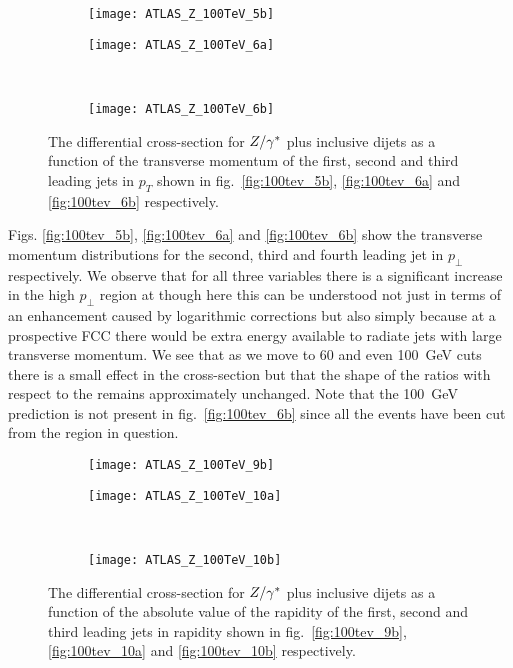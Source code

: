 	\begin{figure}[bth]
		\centering
		\begin{subfigure}[b]{0.48\textwidth}
			\texttt{[image: ATLAS\_Z\_100TeV\_5b]}
			\caption{}
			\label{fig:100tev_5b}
		\end{subfigure}

		\begin{subfigure}[b]{0.48\textwidth}
			\texttt{[image: ATLAS\_Z\_100TeV\_6a]}
			\caption{}
			\label{fig:100tev_6a}
		\end{subfigure}
		~
		\begin{subfigure}[b]{0.48\textwidth}
			\texttt{[image: ATLAS\_Z\_100TeV\_6b]}
			\caption{}
			\label{fig:100tev_6b}
		\end{subfigure}
		\caption{The differential cross-section for $Z/\gamma^*$ plus inclusive dijets as a function of the transverse momentum
		         of the first, second and third leading jets in $p_T$ shown in fig.~\eqref{fig:100tev_5b}, \eqref{fig:100tev_6a}
		         and \eqref{fig:100tev_6b} respectively.}
	\end{figure}

	Figs. \eqref{fig:100tev_5b}, \eqref{fig:100tev_6a} and \eqref{fig:100tev_6b} show the transverse momentum
	distributions for the second, third and fourth leading jet in $p_\perp$ respectively.  We observe that for all three
	variables there is a significant increase in the high $p_\perp$ region at \htev though here this can be understood
	not just in terms of an enhancement caused by logarithmic corrections but also simply because at a prospective FCC
	there would be extra energy available to radiate jets with large transverse momentum.  We see that as we move to
	60 and even 100~GeV cuts there is a small effect in the cross-section but that the shape of the ratios with respect
	to the \stev remains approximately unchanged.  Note that the 100~GeV prediction is not present in
	fig.~\eqref{fig:100tev_6b} since all the events have been cut from the region in question.

	\begin{figure}[bth]
		\centering
		\begin{subfigure}[b]{0.48\textwidth}
			\texttt{[image: ATLAS\_Z\_100TeV\_9b]}
			\caption{}
			\label{fig:100tev_9b}
		\end{subfigure}

		\begin{subfigure}[b]{0.48\textwidth}
			\texttt{[image: ATLAS\_Z\_100TeV\_10a]}
			\caption{}
			\label{fig:100tev_10a}
		\end{subfigure}
		~
		\begin{subfigure}[b]{0.48\textwidth}
			\texttt{[image: ATLAS\_Z\_100TeV\_10b]}
			\caption{}
			\label{fig:100tev_10b}
		\end{subfigure}
		\caption{The differential cross-section for $Z/\gamma^*$ plus inclusive dijets as a function of the absolute value of the rapidity
		         of the first, second and third leading jets in rapidity shown in fig.~\eqref{fig:100tev_9b}, \eqref{fig:100tev_10a}
		         and \eqref{fig:100tev_10b} respectively.}
	\end{figure}

